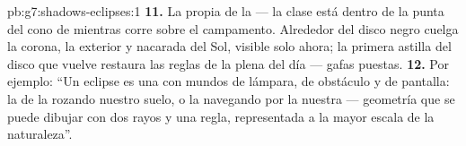 \begin{solution}{pb:g7:shadows-eclipses:1}
\textbf{11.} La propia  de la  --- la clase está
dentro de la punta del cono de  mientras corre sobre el
campamento. Alrededor del disco negro cuelga la corona, la
 exterior y nacarada del Sol, visible solo ahora; la
primera astilla del disco que vuelve restaura las reglas de la plena
 del día --- gafas puestas.
\textbf{12.} Por ejemplo: ``Un eclipse es una  con mundos de
lámpara, de obstáculo y de pantalla: la  de la 
rozando nuestro suelo, o la  navegando por la nuestra ---
geometría que se puede dibujar con dos rayos y una regla, representada
a la mayor escala de la naturaleza''.
\end{solution}
